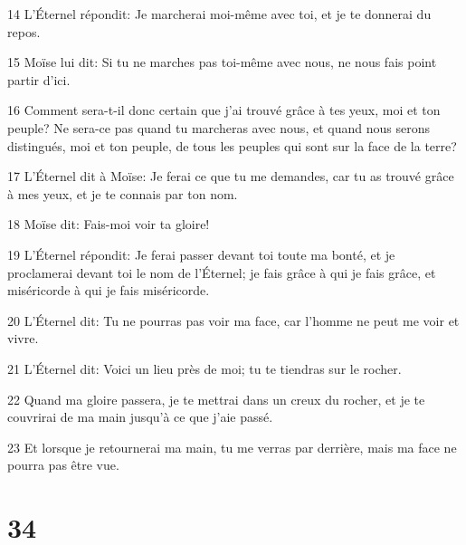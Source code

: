 \par 14 L'Éternel répondit: Je marcherai moi-même avec toi, et je te donnerai du repos.
\par 15 Moïse lui dit: Si tu ne marches pas toi-même avec nous, ne nous fais point partir d'ici.
\par 16 Comment sera-t-il donc certain que j'ai trouvé grâce à tes yeux, moi et ton peuple? Ne sera-ce pas quand tu marcheras avec nous, et quand nous serons distingués, moi et ton peuple, de tous les peuples qui sont sur la face de la terre?
\par 17 L'Éternel dit à Moïse: Je ferai ce que tu me demandes, car tu as trouvé grâce à mes yeux, et je te connais par ton nom.
\par 18 Moïse dit: Fais-moi voir ta gloire!
\par 19 L'Éternel répondit: Je ferai passer devant toi toute ma bonté, et je proclamerai devant toi le nom de l'Éternel; je fais grâce à qui je fais grâce, et miséricorde à qui je fais miséricorde.
\par 20 L'Éternel dit: Tu ne pourras pas voir ma face, car l'homme ne peut me voir et vivre.
\par 21 L'Éternel dit: Voici un lieu près de moi; tu te tiendras sur le rocher.
\par 22 Quand ma gloire passera, je te mettrai dans un creux du rocher, et je te couvrirai de ma main jusqu'à ce que j'aie passé.
\par 23 Et lorsque je retournerai ma main, tu me verras par derrière, mais ma face ne pourra pas être vue.

\chapter{34}

